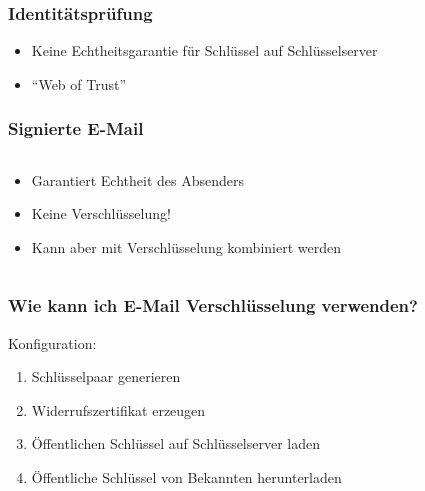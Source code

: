 \begin{frame}
  \frametitle{Identitätsprüfung}
  \begin{itemize}
    \item Keine Echtheitsgarantie für Schlüssel auf Schlüsselserver
    \item ``Web of Trust''
  \end{itemize}
  \center {}
\end{frame}

\begin{frame}
  \frametitle{Signierte E-Mail}
  \begin{columns}[c]
    \begin{column}{0.5\textwidth}
      \begin{itemize}
	\item Garantiert Echtheit des Absenders
	\item Keine Verschlüsselung!
	\item Kann aber mit Verschlüsselung kombiniert werden
      \end{itemize}
    \end{column}
    \begin{column}{0.5\textwidth}
      \center {}
    \end{column}
  \end{columns}
\end{frame}

\begin{frame}
  \frametitle{Wie kann ich E-Mail Verschlüsselung verwenden?}
  
      Konfiguration:
      \begin{enumerate}
        \item Schlüsselpaar generieren
        \item Widerrufszertifikat erzeugen
        \item Öffentlichen Schlüssel auf Schlüsselserver laden
        \item Öffentliche Schlüssel von Bekannten herunterladen
      \end{enumerate}

\end{frame}
